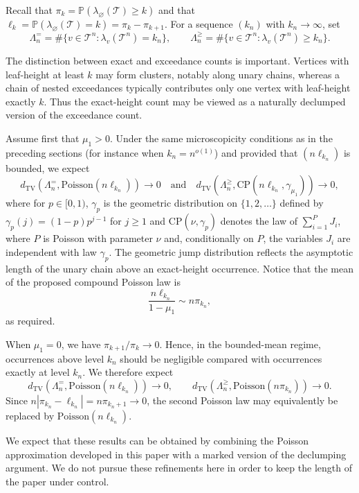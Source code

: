 \documentclass[a4paper,11pt]{article}
\DeclareRobustCommand{\P}{\mathbb{P}}
\DeclareRobustCommand{\1}{\mathbf{1}}
\newcommand{\dTV}{d_{\mathrm{TV}}}
\newcommand{\Po}{\mathrm{Poisson}}
\begin{document}
Recall that $
  \pi_k
  =
  \P(\lambda_\varnothing(\mathcal T)\ge k)$ and that
  $
  \ell_k
  =
  \P(\lambda_\varnothing(\mathcal T)=k)
  =
  \pi_k-\pi_{k+1}$. 
For a sequence $(k_n)$ with $k_n\to\infty$, set
$$
  \Lambda_n^{=}
  =
  \#\{v\in\mathcal T^n:
       \lambda_v(\mathcal T^n)=k_n\},
  \qquad
  \Lambda_n^{\ge}
  =
  \#\{v\in\mathcal T^n:
       \lambda_v(\mathcal T^n)\ge k_n\}.
$$

The distinction between exact and exceedance counts is important. Vertices
with leaf-height at least $k$ may form clusters, notably along unary chains,
whereas a chain of nested exceedances typically contributes only one vertex
with leaf-height exactly $k$. Thus the exact-height count may be viewed as a
naturally declumped version of the exceedance count.


Assume first that $\mu_1>0$. Under the same microscopicity conditions as in
the preceding sections (for instance when $k_n=n^{o(1)}$) and provided
that $(n\ell_{k_n})$ is bounded, we expect
$$
  \dTV\left(
    \Lambda_n^{=},
    \Po(n\ell_{k_n})
  \right)
  \longrightarrow0  \quad\textrm{and}\quad
  \dTV\left(
    \Lambda_n^{\ge},
    \mathrm{CP}(n\ell_{k_n},\gamma_{\mu_1})
  \right)
  \longrightarrow0,
$$
where for $p\in[0,1)$, $\gamma_p$ is the geometric distribution on
$\{1,2,\ldots\}$ defined by $
  \gamma_p(j)
  =
  (1-p)p^{j-1}$ for $j \geq 1$ and
$\mathrm{CP}(\nu,\gamma_p)$ denotes the law of
$\sum_{i=1}^{P}J_i$, where $P$ is Poisson with parameter $\nu$ and,
conditionally on $P$, the variables $J_i$ are independent with law
$\gamma_p$.
The geometric jump distribution reflects the asymptotic length of the unary
chain above an exact-height occurrence. Notice that the mean of the proposed
compound Poisson law is
$$
  \frac{n\ell_{k_n}}{1-\mu_1}
  \sim
  n\pi_{k_n},
$$
as required.

When $\mu_1=0$, we have $\pi_{k+1}/\pi_k\to0$. Hence, in the bounded-mean
regime, occurrences above level $k_n$ should be negligible compared with
occurrences exactly at level $k_n$. We therefore expect
$$
  \dTV\left(
    \Lambda_n^{=},
    \Po(n\ell_{k_n})
  \right)
  \longrightarrow0,
  \qquad
  \dTV\left(
    \Lambda_n^{\ge},
    \Po(n\pi_{k_n})
  \right)
  \longrightarrow0.
$$
Since
$n|\pi_{k_n}-\ell_{k_n}|=n\pi_{k_n+1}\to0$, the second Poisson law may
equivalently be replaced by $\Po(n\ell_{k_n})$.

We expect that these results can be obtained by combining the Poisson
approximation developed in this paper with a marked version of the
declumping argument. We do not pursue these refinements here in order to keep
the length of the paper under control.



{\small

}
\end{document}

